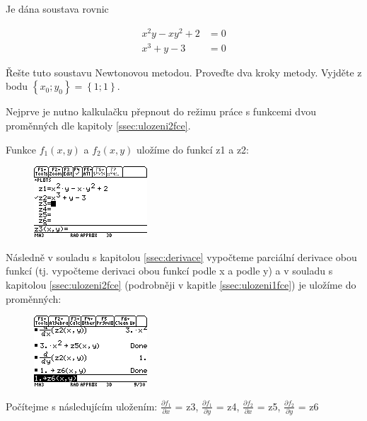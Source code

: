 \documentclass[10pt,a4paper,float]{article}
\begin{document}
Je dána soustava rovnic

\begin{align*}
	x^2 y - x y^2 + 2 &= 0\\
	x^3 + y - 3 &= 0
\end{align*}

Řešte tuto soustavu Newtonovou metodou. Proveďte dva kroky metody. Vyjděte z bodu $ \left\{ x_0; y_0 \right\} = \left\{ 1; 1 \right\} $.

Nejprve je nutno kalkulačku přepnout do režimu práce s funkcemi dvou proměnných dle kapitoly \ref{ssec:ulozeni2fce}.

Funkce $f_1(x,y)$ a $f_2(x,y)$ uložíme do funkcí z1 a z2:

\begin{figure}[H]
	\centering
	\includegraphics[width=.5\textwidth]{img/2NEWTON1.PNG}
\end{figure}

Následně v souladu s kapitolou \ref{ssec:derivace} vypočteme parciální derivace obou funkcí (tj. vypočteme derivaci obou funkcí podle x a podle y) a v souladu s kapitolou \ref{ssec:ulozeni2fce} (podrobněji v kapitle \ref{ssec:ulozeni1fce}) je uložíme do proměnných:

\begin{figure}[H]
	\centering
	\includegraphics[width=.5\textwidth]{img/2NEWTON2.PNG}
\end{figure}

Počítejme s následujícím uložením: $\frac{\partial f_1}{\partial x}$ = z3, $\frac{\partial f_1}{\partial y}$ = z4, $\frac{\partial f_2}{\partial x}$ = z5, $\frac{\partial f_2}{\partial y}$ = z6

\pagebreak
\end{document}
